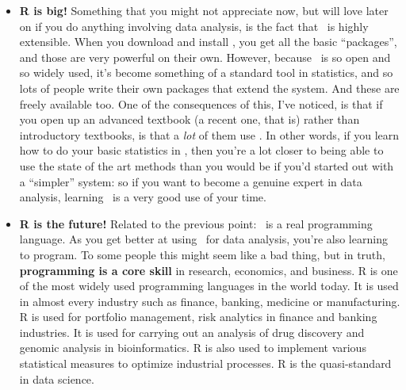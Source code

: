 \begin{itemize}
	\item \textbf{R is big!} Something that you might not appreciate now, but will love later on if you do anything involving data analysis, is the fact that \R\ is highly extensible. When you download and install \R, you get all the basic ``packages'', and those are very powerful on their own. However, because \R\ is so open and so widely used, it's become something of a standard tool in statistics, and so lots of people write their own packages that extend the system. And these are freely available too. One of the consequences of this, I've noticed, is that if you open up an advanced textbook (a recent one, that is) rather than introductory textbooks, is that a {\it lot} of them use \R. In other words, if you learn how to do your basic statistics in \R, then you're a lot closer to being able to use the state of the art methods than you would be if you'd started out with a ``simpler'' system: so if you want to become a genuine expert in data analysis, learning \R\ is a very good use of your time.
	\item \textbf{R is the future!} Related to the previous point: \R\ is a real programming language. As you get better at using \R\ for data analysis, you're also learning to program. To some people this might seem like a bad thing, but in truth, \textbf{programming is a core skill} in research, economics, and business.
	R is one of the most widely used programming languages in the world today. It is used in almost every industry such as finance, banking, medicine or manufacturing. R is used for portfolio management, risk analytics in finance and banking industries. It is used for carrying out an analysis of drug discovery and genomic analysis in bioinformatics. R is also used to implement various statistical measures to optimize industrial processes. R is the quasi-standard in data science. 
\end{itemize}



